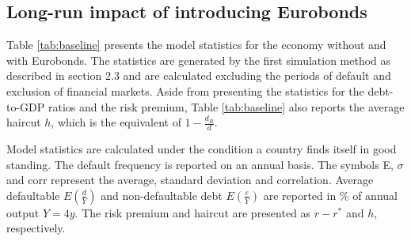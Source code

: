 \subsection{Long-run impact of introducing Eurobonds}
Table \ref{tab:baseline} presents the model statistics for the economy without and with Eurobonds. The statistics are generated by the first simulation method as described in section 2.3 and are calculated excluding the periods of default and exclusion of financial markets. Aside from presenting the statistics for the debt-to-GDP ratios and the risk premium, Table \ref{tab:baseline} also reports the average haircut $h$, which is the equivalent of $1-\frac{d_B}{d}$.\\
\begin{table}[H]\large
\setlength{\arrayrulewidth}{0.3mm}
\centering
   \caption{\textbf{Baseline results}}
    \label{tab:baseline}
    \vspace{1mm}
    \begin{tablenotes}
      \footnotesize
      \item Model statistics are calculated under the condition a country finds itself in good standing. The default frequency is reported on an annual basis. The symbols E, $\sigma$ and corr represent the average, standard deviation and correlation. Average defaultable $E(\frac{d}{Y})$ and non-defaultable debt $E(\frac{e}{Y})$ are reported in \% of annual output $Y = 4y$. The risk premium and haircut are presented as $r-r^*$ and $h$, respectively.
    \end{tablenotes}
\end{table}
